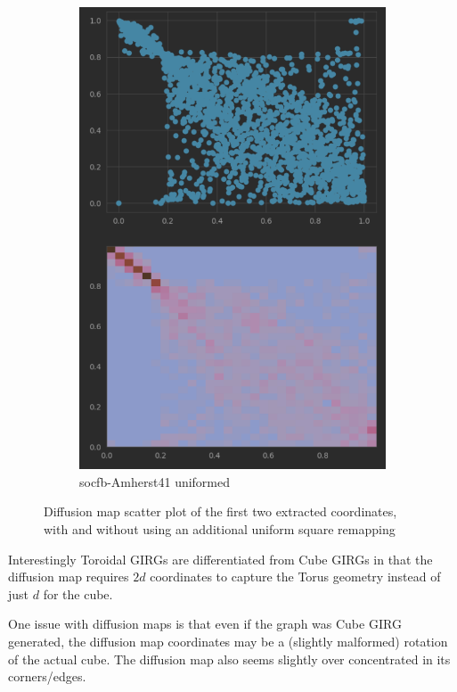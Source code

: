 \begin{figure}
\begin{subfigure}{0.45\textwidth}
      \includegraphics[width=\linewidth]{figures/real_diffmap_plot_uniformed.png}
      \caption{socfb-Amherst41 uniformed}
      \label{fig:sub4}
    \end{subfigure}
  
    \caption{Diffusion map scatter plot of the first two extracted coordinates, with and without using an additional uniform square remapping}
    \label{fig:diffmap_uniformed_vs_nonuniformed}
\end{figure}



Interestingly Toroidal GIRGs are differentiated from Cube GIRGs in that the diffusion map requires $2d$ coordinates to capture the Torus geometry instead of just $d$ for the cube.


One issue with diffusion maps is that even if the graph was Cube GIRG generated, the diffusion map coordinates may be a (slightly malformed) rotation of the actual cube. The diffusion map also seems slightly over concentrated in its corners/edges. 


